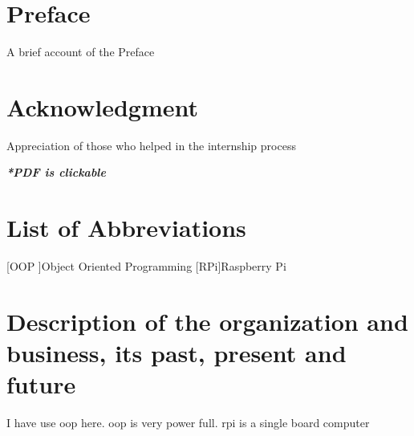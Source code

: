 \documentclass[a4paper,12pt]{report}%
\begin{document}



\chapter*{Preface}
A brief account of the Preface
\cleardoublepage



\chapter*{Acknowledgment}
Appreciation of those who helped in the internship process

\tableofcontents %
\vfill
\begin{center}
	\textbf{\textit{*PDF is clickable}}
\end{center}

\chapter*{List of Abbreviations}
\begin{acronym}
	[OOP ]{Object Oriented Programming }
	[RPi]{Raspberry Pi}
\end{acronym}

\listoffigures %
\listoftables %




\pagebreak

\chapter{Description of the organization and business, its past, present and	future}
I have use \ac{oop} here. \ac{oop} is very power full. \Ac{rpi} is a single board computer
\end{document}

